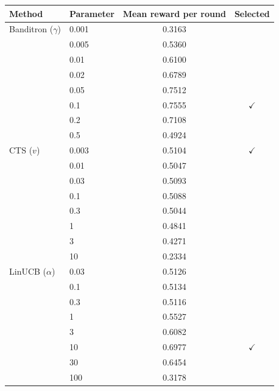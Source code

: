 \begin{tabular}{llcc}
\toprule
Method & Parameter & Mean reward per round & Selected \\
\midrule
Banditron ($\gamma$) & 0.001 & 0.3163 &  \\
 & 0.005 & 0.5360 &  \\
 & 0.01 & 0.6100 &  \\
 & 0.02 & 0.6789 &  \\
 & 0.05 & 0.7512 &  \\
 & 0.1 & 0.7555 & $\checkmark$ \\
 & 0.2 & 0.7108 &  \\
 & 0.5 & 0.4924 &  \\
CTS ($v$) & 0.003 & 0.5104 & $\checkmark$ \\
 & 0.01 & 0.5047 &  \\
 & 0.03 & 0.5093 &  \\
 & 0.1 & 0.5088 &  \\
 & 0.3 & 0.5044 &  \\
 & 1 & 0.4841 &  \\
 & 3 & 0.4271 &  \\
 & 10 & 0.2334 &  \\
LinUCB ($\alpha$) & 0.03 & 0.5126 &  \\
 & 0.1 & 0.5134 &  \\
 & 0.3 & 0.5116 &  \\
 & 1 & 0.5527 &  \\
 & 3 & 0.6082 &  \\
 & 10 & 0.6977 & $\checkmark$ \\
 & 30 & 0.6454 &  \\
 & 100 & 0.3178 &  \\
\bottomrule
\end{tabular}
